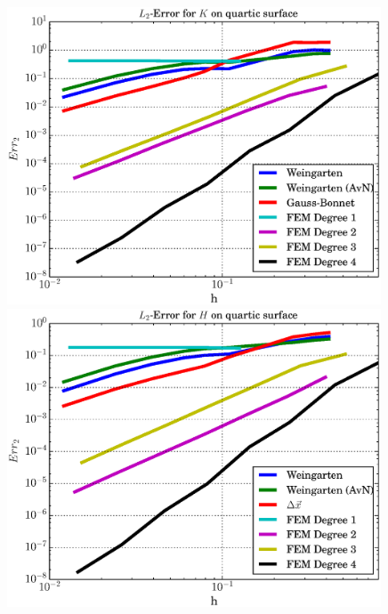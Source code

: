 \begin{figure}
\begin{minipage}[htp]{.23\textwidth}
    \end{minipage}\\
    \begin{minipage}[htp]{.23\textwidth}
      \centering
      \includegraphics[width=0.99\textwidth]{bilder/quartic/L2K.eps}
    \end{minipage}\hfill
    \begin{minipage}[htp]{.23\textwidth}
      \centering
      \includegraphics[width=0.99\textwidth]{bilder/quartic/L2H.eps}
    \end{minipage}\\
    \begin{minipage}[htp]{.23\textwidth}

\end{minipage}
\end{figure}
